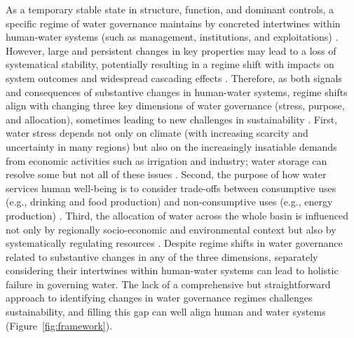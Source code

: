 As a temporary stable state in structure, function, and dominant controls, a specific regime of water governance maintains by concreted intertwines within human-water systems (such as management, institutions, and exploitations)
\cite{carpenterEarlyWarningsRegime2011}.
However, large and persistent changes in key properties may lead to a loss of systematical stability, potentially resulting in a regime shift with impacts on system outcomes and widespread cascading effects
\cite{rochaCascadingregimeshifts2018, gregrCascadingsocialecologicalcosts2020}.
Therefore, as both signals and consequences of substantive changes in human-water systems, regime shifts align with changing three key dimensions of water governance (stress, purpose, and allocation), sometimes leading to new challenges in sustainability %
\cite{undpwatergovernancefacilityWaterGovernanceIssue, mariajacobsonUserguideassessing2013, kjellenWatergovernanceperspective2015}.
First, water stress depends not only on climate (with increasing scarcity and uncertainty in many regions) but also on the increasingly insatiable demands from economic activities such as irrigation and industry; water storage can resolve some but not all of these issues
\cite{greveGlobalassessmentwater2018,wadaHumanwaterinterface2017,qinFlexibilityintensityglobal2019}.
Second, the purpose of how water services human well-being is to consider trade-offs between consumptive uses (e.g., drinking and food production) and non-consumptive uses (e.g., energy production)
\cite{liuWaterscarcityassessments2017,florkeWatercompetitioncities2018,kleemannQuantifyinginterregionalflows2020}.
Third, the allocation of water across the whole basin is influenced not only by regionally socio-economic and environmental context but also by systematically regulating resources
\cite{roobavannanRoleSectoralTransformation2017,speedBasinwaterallocation2013}.
Despite regime shifts in water governance related to substantive changes in any of the three dimensions, separately considering their intertwines within human-water systems can lead to holistic failure in governing water.
The lack of a comprehensive but straightforward approach to identifying changes in water governance regimes challenges sustainability, and filling this gap can well align human and water systems (Figure~\ref{fig:framework}).

